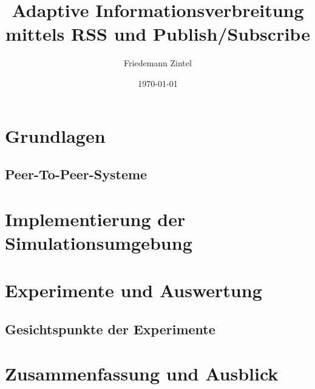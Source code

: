 \documentclass{scrbook}
\title{Adaptive Informationsverbreitung mittels RSS und Publish/Subscribe}
\author{Friedemann Zintel}
\date{\today}
\begin{document}

\maketitle

%


\frontmatter

\setcounter{tocdepth}{3}
\tableofcontents
\listoffigures

\mainmatter


\chapter{Grundlagen}

\section{Peer-To-Peer-Systeme}


\chapter{Implementierung der Simulationsumgebung}
\chapter{Experimente und Auswertung}
\section{Gesichtspunkte der Experimente}
\chapter{Zusammenfassung und Ausblick}

\backmatter




\end{document}
